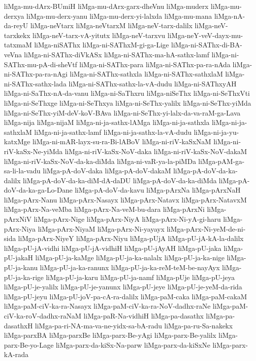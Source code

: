 {liMga-mu-dArx-BUmiH
liMga-mu-dArx-garx-dheVnu
liMga-muderx
liMga-mu-derxya
liMga-mu-derx-yanu
liMga-mu-derx-yi-lalxda
liMga-mu-mana
liMga-nA-da-reyU
liMga-neVtarx
liMga-neVtarxM
liMga-neV-tarx-dalilx
liMga-neV-tarxkekx
liMga-neV-tarx-vA-yitutx
liMga-neV-tarxvu
liMga-neY-veV-dayx-mu-tatxmaM
liMga-niSAThx
liMga-ni-SAThxM-gi-ga-Lige
liMga-ni-SAThx-di-BA-veVna
liMga-ni-SAThx-diVkASx
liMga-ni-SAThx-ma-hA-sathx-lamf
liMga-ni-SAThx-mu-pA-di-sheVtf
liMga-ni-SAThx-para
liMga-ni-SAThx-pa-ra-nAda
liMga-ni-SAThx-pa-ra-nAgi
liMga-ni-SAThx-sathxla
liMga-ni-SAThx-sathxlaM
liMga-ni-SAThx-sathx-lada
liMga-ni-SAThx-sathx-la-vA-dudu
liMga-ni-SAThxyAH
liMga-ni-SaThx-nA-da-vanu
liMga-ni-SaThxru
liMga-niSeThx
liMga-ni-SeThxVti
liMga-ni-SeThxge
liMga-ni-SeThxya
liMga-ni-SeThx-yalilx
liMga-ni-SeThx-yiMda
liMga-ni-SeThx-yiM-deV-koV-BAva
liMga-ni-SeThx-yi-lalx-da-va-raM-ga-Lava
liMga-nija
liMga-nijaM
liMga-ni-ja-sathx-lAMga
liMga-ni-ja-sathxla
liMga-ni-ja-sathxlaM
liMga-ni-ja-sathx-lamf
liMga-ni-ja-sathx-la-vA-dudu
liMga-ni-ja-yu-katxMge
liMga-ni-mAR-layx-su-ra-Bi-lABoV
liMga-ni-riV-kaSxNaM
liMga-ni-riV-kaSx-Ne-yiMda
liMga-ni-riV-kaSx-NoV-daka
liMga-ni-riV-kaSx-NoV-dakaM
liMga-ni-riV-kaSx-NoV-da-ka-diMda
liMga-ni-vaR-ya-la-piMDa
liMga-pAM-ga-sa-li-la-vadu
liMga-pA-doV-daka
liMga-pA-doV-dakaM
liMga-pA-doV-da-ka-dalilx
liMga-pA-doV-da-ka-diM-dA-daDU
liMga-pA-doV-da-ka-diMda
liMga-pA-doV-da-ka-ga-Lo-Dane
liMga-pA-doV-da-kavu
liMga-pArxNa
liMga-pArxNaH
liMga-pArx-Nanu
liMga-pArx-Nasayx
liMga-pArx-Natavx
liMga-pArx-NatavxM
liMga-pArx-Na-veMba
liMga-pArx-Na-veM-bu-dara
liMga-pArxNi
liMga-pArxNiV
liMga-pArx-Nige
liMga-pArx-NiyA
liMga-pArx-Ni-yA-gi-haru
liMga-pArx-Niya
liMga-pArx-NiyaM
liMga-pArx-Ni-yayayx
liMga-pArx-Ni-yeM-de-ni-sida
liMga-pArx-NiyeY
liMga-pArx-Niyu
liMga-pUjA
liMga-pU-jA-kA-la-dalilx
liMga-pU-jA-vidhi
liMga-pU-jA-vidhiH
liMga-pU-jAyAH
liMga-pU-jaka
liMga-pU-jakaH
liMga-pU-ja-kaMge
liMga-pU-ja-ka-nalalx
liMga-pU-ja-ka-nige
liMga-pU-ja-kanu
liMga-pU-ja-ka-ranunx
liMga-pU-ja-ka-reM-teM-be-nayAyx
liMga-pU-ja-ka-rige
liMga-pU-ja-karu
liMga-pU-ja-namf
liMga-pUje
liMga-pU-jeya
liMga-pU-je-yalilx
liMga-pU-je-yanunx
liMga-pU-jeye
liMga-pU-je-yeM-da-rida
liMga-pU-jeyu
liMga-pU-joV-pa-cA-ra-dalilx
liMga-paM-caka
liMga-paM-cakaM
liMga-paM-ciV-ka-ra-Nasayx
liMga-paM-ciV-ka-ra-NoV-dadhx-raNe
liMga-paM-ciV-ka-roV-dadhx-raNaM
liMga-paR-Na-vidhiH
liMga-pa-dasathx
liMga-pa-dasathxH
liMga-pa-ri-NA-ma-va-ne-yidx-sa-bA-radu
liMga-pa-ru-Sa-nakekx
liMga-parxBA
liMga-parxBe
liMga-parx-Be-yAgi
liMga-parx-Be-yalilx
liMga-parx-Be-yo-Lage
liMga-parx-da-kiSx-Na-parw
liMga-parx-da-kiSxNe
liMga-parx-kA-rada
}
